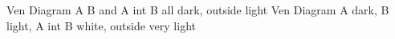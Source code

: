 \documentclass{article}
\begin{document}
Ven Diagram A B and A int B all dark, outside light
Ven Diagram A dark, B light, A int B white, outside very light
\end{document}
